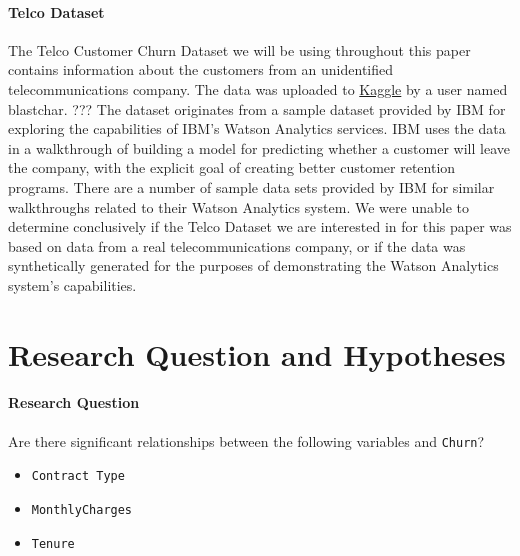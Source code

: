 \documentclass[man, floatsintext]{apa6}
\begin{document}
\hspace{0.5mm}

\paragraph{Telco Dataset}

The Telco Customer Churn Dataset we will be using throughout this paper contains information about the customers from an unidentified telecommunications company. The data was uploaded to \href{https://www.kaggle.com/blastchar/telco-customer-churn}{Kaggle} by a user named blastchar. \cite{blastchar_2018} ??? The dataset originates from a sample dataset provided by IBM for exploring the capabilities of IBM's Watson Analytics services. IBM uses the data in a walkthrough of building a model for predicting whether a customer will leave the company, with the explicit goal of creating better customer retention programs. \cite{ibm_telco_2015} There are a number of sample data sets provided by IBM for similar walkthroughs related to their Watson Analytics system. \cite{ibm_data_2015} We were unable to determine conclusively if the Telco Dataset we are interested in for this paper was based on data from a real telecommunications company, or if the data was synthetically generated for the purposes of demonstrating the Watson Analytics system's capabilities.

\section{Research Question and Hypotheses}
\paragraph{Research Question}

Are there significant relationships between the following variables and \texttt{Churn}?
\begin{itemize}
\item{\texttt{Contract Type}}
\item{\texttt{MonthlyCharges}}
\item{\texttt{Tenure}}
\end{itemize}
\end{document}
